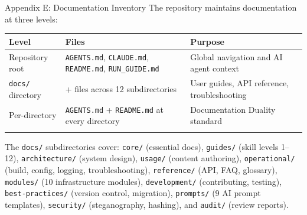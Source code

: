 \documentclass[
  ignorenonframetext,
]{beamer}
\newcounter{none} %
\begin{document}
\begin{frame}[fragile]{Appendix E: Documentation Inventory}
\protect{}\label{appendix-e-documentation-inventory}
The repository maintains documentation at three levels:

{\def\LTcaptype{none} %
\begin{longtable}[]{@{}
  >{\raggedright\arraybackslash}p{}
  >{\centering\arraybackslash}p{}
  >{\raggedright\arraybackslash}p{}@{}}
\toprule\noalign{}
\begin{minipage}[b]{\linewidth}\raggedright
Level
\end{minipage} & \begin{minipage}[b]{\linewidth}\centering
Files
\end{minipage} & \begin{minipage}[b]{\linewidth}\raggedright
Purpose
\end{minipage} \\
\midrule\noalign{}
\endhead
Repository root & \texttt{AGENTS.md}, \texttt{CLAUDE.md},
\texttt{README.md}, \texttt{RUN\_GUIDE.md} & Global navigation and AI
agent context \\
\texttt{docs/} directory & 90+ files across 12 subdirectories & User
guides, API reference, troubleshooting \\
Per-directory & \texttt{AGENTS.md} + \texttt{README.md} at every
directory & Documentation Duality standard \\
\bottomrule\noalign{}
\end{longtable}
}

The \texttt{docs/} subdirectories cover: \texttt{core/} (essential
docs), \texttt{guides/} (skill levels 1--12), \texttt{architecture/}
(system design), \texttt{usage/} (content authoring),
\texttt{operational/} (build, config, logging, troubleshooting),
\texttt{reference/} (API, FAQ, glossary), \texttt{modules/} (10
infrastructure modules), \texttt{development/} (contributing, testing),
\texttt{best-practices/} (version control, migration), \texttt{prompts/}
(9 AI prompt templates), \texttt{security/} (steganography, hashing),
and \texttt{audit/} (review reports).
\end{frame}
\end{document}
